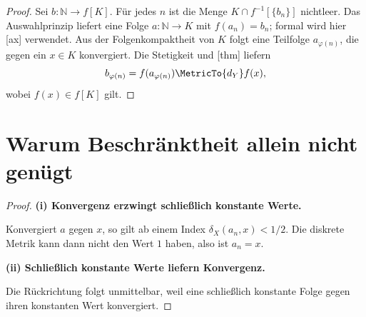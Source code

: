 \documentclass[main.tex]{subfiles}
\begin{document}
\begin{proof}
Sei \(b\colon\mathbb N\to f[K]\). Für jedes \(n\) ist die Menge
\(K\cap f^{-1}[\{b_n\}]\) nichtleer. Das Auswahlprinzip liefert eine Folge
\(a\colon\mathbb N\to K\) mit \(f(a_n)=b_n\); formal wird hier
[ax] verwendet. Aus der Folgenkompaktheit von
\(K\) folgt eine Teilfolge \(a_{\varphi(n)}\), die gegen ein \(x\in K\)
konvergiert. Die Stetigkeit und
[thm] liefern
\[
 b_{\varphi(n)}=f(a_{\varphi(n)})\MetricTo{d_Y}f(x),
\]
wobei \(f(x)\in f[K]\) gilt.
\end{proof}

\section{Warum Beschränktheit allein nicht genügt}

\begin{proof}
\par\medskip\noindent\textbf{(i) Konvergenz erzwingt schließlich konstante Werte.}\par
Konvergiert \(a\) gegen \(x\), so gilt ab einem Index
\(\delta_X(a_n,x)<1/2\). Die diskrete Metrik kann dann nicht den Wert \(1\)
haben, also ist \(a_n=x\). \par\medskip\noindent\textbf{(ii) Schließlich konstante Werte liefern Konvergenz.}\par
Die Rückrichtung folgt unmittelbar, weil eine
schließlich konstante Folge gegen ihren konstanten Wert konvergiert.
\end{proof}
\end{document}
